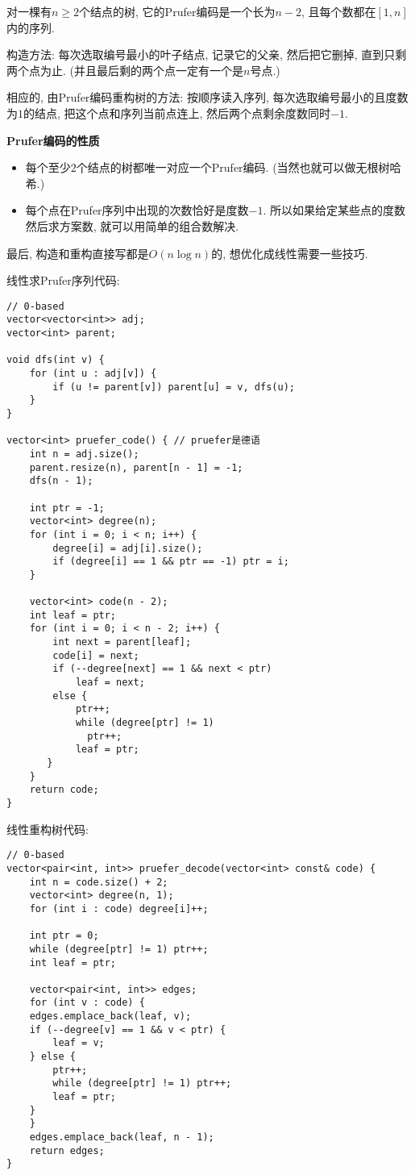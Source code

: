 对一棵有$n \ge 2$个结点的树, 它的Prufer编码是一个长为$n - 2$, 且每个数都在$[1, n]$内的序列.

构造方法: 每次选取编号最小的叶子结点, 记录它的父亲, 然后把它删掉, 直到只剩两个点为止. (并且最后剩的两个点一定有一个是$n$号点.)

相应的, 由Prufer编码重构树的方法: 按顺序读入序列, 每次选取编号最小的且度数为$1$的结点, 把这个点和序列当前点连上, 然后两个点剩余度数同时$-1$. 

\textbf{Prufer编码的性质}

\begin{itemize}
    \item 每个至少$2$个结点的树都唯一对应一个Prufer编码. (当然也就可以做无根树哈希.)
    \item 每个点在Prufer序列中出现的次数恰好是度数$-1$. 所以如果给定某些点的度数然后求方案数, 就可以用简单的组合数解决.
\end{itemize}


最后, 构造和重构直接写都是$O(n\log n)$的, 想优化成线性需要一些技巧.

线性求Prufer序列代码:
\begin{verbatim}
// 0-based
vector<vector<int>> adj;
vector<int> parent;

void dfs(int v) {
    for (int u : adj[v]) {
        if (u != parent[v]) parent[u] = v, dfs(u);
    }
}

vector<int> pruefer_code() { // pruefer是德语
    int n = adj.size();
    parent.resize(n), parent[n - 1] = -1;
    dfs(n - 1);

    int ptr = -1;
    vector<int> degree(n);
    for (int i = 0; i < n; i++) {
        degree[i] = adj[i].size();
        if (degree[i] == 1 && ptr == -1) ptr = i;
    }

    vector<int> code(n - 2);
    int leaf = ptr;
    for (int i = 0; i < n - 2; i++) {
        int next = parent[leaf];
        code[i] = next;
        if (--degree[next] == 1 && next < ptr)
            leaf = next;
        else {
            ptr++;
            while (degree[ptr] != 1)
              ptr++;
            leaf = ptr;
       }
    }
    return code;
}
\end{verbatim}

线性重构树代码:
\begin{verbatim}
// 0-based
vector<pair<int, int>> pruefer_decode(vector<int> const& code) {
    int n = code.size() + 2;
    vector<int> degree(n, 1);
    for (int i : code) degree[i]++;

    int ptr = 0;
    while (degree[ptr] != 1) ptr++;
    int leaf = ptr;

    vector<pair<int, int>> edges;
    for (int v : code) {
    edges.emplace_back(leaf, v);
    if (--degree[v] == 1 && v < ptr) {
        leaf = v;
    } else {
        ptr++;
        while (degree[ptr] != 1) ptr++;
        leaf = ptr;
    }
    }
    edges.emplace_back(leaf, n - 1);
    return edges;
}
\end{verbatim}